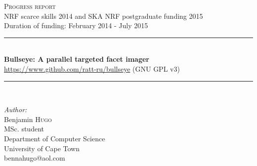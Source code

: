 \documentclass[a4paper,10pt]{article}
\begin{document}
\begin{titlepage}

\newcommand{\HRule}{\rule{\linewidth}{0.5mm}} %

\center %
 

 

\textsc{\LARGE Progress report}\\
{\small NRF scarce skills 2014 and SKA NRF postgraduate funding 2015}\\
{\small Duration of funding: February 2014 - July 2015}\\[1.5cm]

\HRule \\[0.4cm]
{ \huge \bfseries Bullseye: A parallel targeted facet imager}\\[0.4cm]
{ \large \url{https://www.github.com/ratt-ru/bullseye} (GNU GPL v3)}\\
\HRule \\[1.5cm]
 

\begin{minipage}{0.4\textwidth}
\begin{flushleft} \large
\emph{Author:}\\
Benjamin \textsc{Hugo}\\[0.2cm] %
\small{MSc. student}\\
\small{Department of Computer Science}\\
\small{University of Cape Town}\\
\small{bennahugo@aol.com}


\end{flushleft}
\end{minipage}
\end{titlepage}
\end{document}
